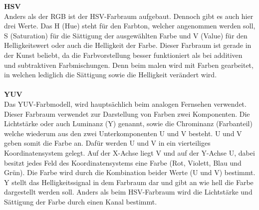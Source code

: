 \textbf{HSV}\label{s.hsv}\\
Anders als der RGB ist der HSV-Farbraum aufgebaut. Dennoch gibt es auch hier drei Werte. Das H (Hue) steht für den Farbton, welcher angenommen werden soll, S (Saturation) für die Sättigung der ausgewählten Farbe und V (Value) für den Helligkeitswert oder auch die Helligkeit der Farbe. Dieser Farbraum ist gerade in der Kunst beliebt, da die Farbvorstellung besser funktioniert als bei additiven und subtraktiven Farbmischungen. Denn beim malen wird mit Farben gearbeitet, in welchen lediglich die Sättigung sowie die Helligkeit verändert wird.\\\\
\textbf{YUV}\label{s.lab}\\
Das YUV-Farbmodell, wird hauptsächlich beim analogen Fernsehen verwendet. Dieser Farbraum verwendet zur Darstellung von Farben zwei Komponenten. Die Lichtstärke oder auch Luminanz (Y) genannt, sowie die Chrominanz (Farbanteil) welche wiederum aus den zwei Unterkomponenten U und V besteht. U und V geben somit die Farbe an. Dafür werden U und V in ein vierteiliges Koordinatensystem gelegt. Auf der X-Achse liegt V und auf der Y-Achse U, dabei besitzt jedes Feld des Koordinatensystems eine Farbe (Rot, Violett, Blau und Grün). Die Farbe wird durch die Kombination beider Werte (U und V) bestimmt. Y stellt das Helligkeitssignal in dem Farbraum dar und gibt an wie hell die Farbe dargestellt werden soll. Anders als beim HSV-Farbraum wird die Lichtstärke und Sättigung der Farbe durch einen Kanal bestimmt. 
